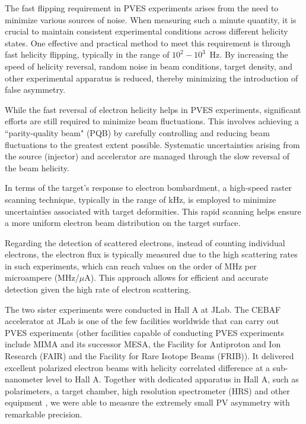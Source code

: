 The fast flipping requirement in PVES experiments arises from the need to minimize various sources of noise. When measuring such a minute quantity, it is crucial to maintain consistent experimental conditions across different helicity states. One effective and practical method to meet this requirement is through fast helicity flipping, typically in the range of $10^2 - 10^3$~Hz. By increasing the speed of helicity reversal, random noise in beam conditions, target density, and other experimental apparatus is reduced, thereby minimizing the introduction of false asymmetry. %

While the fast reversal of electron helicity helps in PVES experiments, significant efforts are still required to minimize beam fluctuations. This involves achieving a ``parity-quality beam" (PQB) by carefully controlling and reducing beam fluctuations to the greatest extent possible. Systematic uncertainties arising from the source (injector) and accelerator are managed through the slow reversal of the beam helicity.

In terms of the target's response to electron bombardment, a high-speed raster scanning technique, typically in the range of kHz, is employed to minimize uncertainties associated with target deformities. This rapid scanning helps ensure a more uniform electron beam distribution on the target surface.

Regarding the detection of scattered electrons, instead of counting individual electrons, the electron flux is typically measured due to the high scattering rates in such experiments, which can reach values on the order of MHz per microampere (MHz/$\mu$A). This approach allows for efficient and accurate detection given the high rate of electron scattering.

The two sister experiments were conducted in Hall A at JLab. The CEBAF accelerator \cite{10.1146/annurev.nucl.51.101701.132327} 
at JLab is one of the few facilities worldwide that can carry out PVES experiments
(other facilities capable of conducting PVES experiments include MIMA and its successor MESA, 
the Facility for Antiproton and Ion Research (FAIR) and the Facility for Rare Isotope Beams (FRIB)). 
It delivered excellent polarized electron beams with helicity correlated difference at 
a sub-nanometer level to Hall A. Together with dedicated apparatus in Hall A, such
as polarimeters, a target chamber, high resolution spectrometer (HRS) and other equipment \cite{ALCORN2004294},
we were able to measure the extremely small PV asymmetry with remarkable precision.

